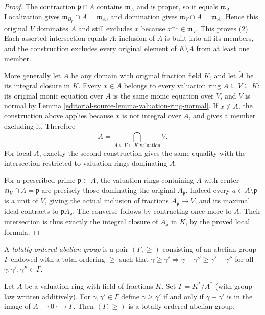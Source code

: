 \begin{proof}
The contraction $\mathfrak p\cap A$
contains $\mathfrak m_A$ and
is proper, so it equals
$\mathfrak m_A$. Localization
gives
$\mathfrak m_{B_{\mathfrak p}}\cap A=\mathfrak m_A$,
and domination gives
$\mathfrak m_V\cap A=\mathfrak m_A$.
Hence this original $V$
dominates $A$ and still
excludes $x$ because
$x^{-1}\in\mathfrak m_V$.
This proves (2). Each
asserted intersection equals
$A$: inclusion of $A$
is built into all its
members, and the construction
excludes every original element
of $K\setminus A$ from
at least one member.

More generally let $A$
be any domain with original
fraction field $K$, and
let $\widetilde A$ be its
integral closure in $K$.
Every $x\in\widetilde A$
belongs to every valuation
ring $A\subseteq V\subseteq K$:
its original monic equation
over $A$ is the same
monic equation over $V$,
and $V$ is normal by
Lemma \ref{editorial-source-lemma-valuation-ring-normal}.
If $x\notin\widetilde A$,
the construction above applies
because $x$ is not integral
over $A$, and gives a
member excluding it. Therefore
$$
\widetilde A=\bigcap_{A\subseteq V\subseteq K\text{ valuation}}V.
$$
For local $A$, exactly the
second construction gives
the same equality with the
intersection restricted to
valuation rings dominating $A$.

For a prescribed prime
$\mathfrak p\subset A$, the
valuation rings containing
$A$ with center
$\mathfrak m_V\cap A=\mathfrak p$
are precisely those dominating
the original $A_{\mathfrak p}$.
Indeed every $a\in A\setminus\mathfrak p$
is a unit of $V$, giving
the actual inclusion of
fractions $A_{\mathfrak p}\to V$,
and its maximal ideal
contracts to $\mathfrak pA_{\mathfrak p}$.
The converse follows by
contracting once more to
$A$. Their intersection
is thus exactly the
integral closure of
$A_{\mathfrak p}$ in $K$,
by the proved local formula.
\end{proof}

\noindent
A {\it totally ordered abelian group} is a pair $(\Gamma, \geq)$
consisting of an abelian group $\Gamma$ endowed with a total
ordering $\geq$ such that $\gamma \geq \gamma' \Rightarrow
\gamma + \gamma'' \geq \gamma' + \gamma''$ for all
$\gamma, \gamma', \gamma'' \in \Gamma$.

\begin{lemma}
\label{editorial-source-lemma-valuation-group}
Let $A$ be a valuation ring with field of fractions $K$.
Set $\Gamma = K^*/A^*$ (with group law written additively).
For $\gamma, \gamma' \in \Gamma$
define $\gamma \geq \gamma'$ if and only if
$\gamma - \gamma'$ is in the image of $A - \{0\} \to \Gamma$.
Then $(\Gamma, \geq)$ is a totally ordered abelian group.
\end{lemma}

